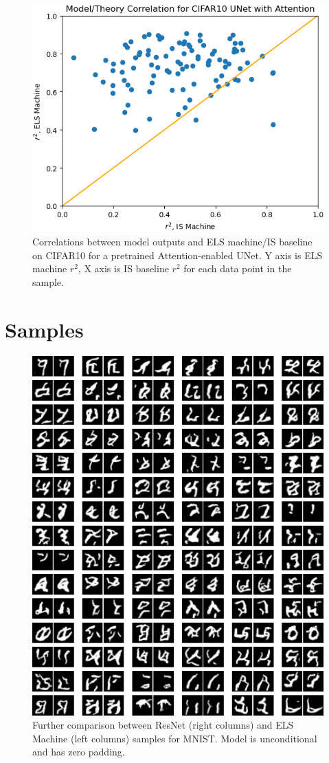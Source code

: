 \documentclass{article}
\theoremstyle{plain}
\theoremstyle{definition}
\theoremstyle{remark}
\begin{document}
\begin{figure}
    \centering
    \includegraphics[width=0.4\linewidth]{scatter_cifar10_zeros_corrs_attention_m.png}

    \caption{Correlations between model outputs and ELS machine/IS baseline on CIFAR10 for a pretrained Attention-enabled UNet. Y axis is ELS machine $r^2$, X axis is IS baseline $r^2$ for each data point in the sample.}
    \label{fig:a3}
\end{figure}





\newpage

\section{Samples}\label{appendix:samples}

\begin{figure}
    \centering
    \includegraphics[width=0.9\linewidth]{mnist_zeros_samps_resnet_m.png}
    \caption{Further comparison between ResNet (right columns) and ELS Machine (left columns) samples for MNIST. Model is unconditional and has zero padding.}
    \label{fig:resnet-mnist-zeros}
\end{figure}
\end{document}
